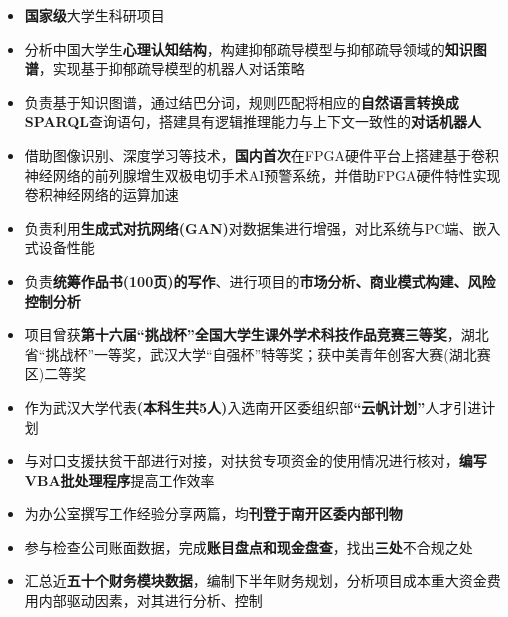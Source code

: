 \documentclass{resume}
\begin{document}
\begin{itemize}
    \item \textbf{国家级}大学生科研项目
    \item 分析中国大学生\textbf{心理认知结构}，构建抑郁疏导模型与抑郁疏导领域的\textbf{知识图谱}，实现基于抑郁疏导模型的机器人对话策略
    \item 负责基于知识图谱，通过结巴分词，规则匹配将相应的\textbf{自然语言转换成SPARQL}查询语句，搭建具有逻辑推理能力与上下文一致性的\textbf{对话机器人}
\end{itemize}

\begin{itemize}
    \item 借助图像识别、深度学习等技术，\textbf{国内首次}在FPGA硬件平台上搭建基于卷积神经网络的前列腺增生双极电切手术AI预警系统，并借助FPGA硬件特性实现卷积神经网络的运算加速
    \item 负责利用\textbf{生成式对抗网络(GAN)}对数据集进行增强，对比系统与PC端、嵌入式设备性能
    \item 负责\textbf{统筹作品书(100页)的写作}、进行项目的\textbf{市场分析、商业模式构建、风险控制分析}
    \item 项目曾获\textbf{第十六届``挑战杯''全国大学生课外学术科技作品竞赛三等奖}，湖北省``挑战杯''一等奖，武汉大学``自强杯''特等奖；获中美青年创客大赛(湖北赛区)二等奖
\end{itemize}

\begin{itemize}
    \item 作为武汉大学代表\textbf{(本科生共5人)}入选南开区委组织部\textbf{``云帆计划''}人才引进计划
    \item 与对口支援扶贫干部进行对接，对扶贫专项资金的使用情况进行核对，\textbf{编写VBA批处理程序}提高工作效率
    \item 为办公室撰写工作经验分享两篇，均\textbf{刊登于南开区委内部刊物}
\end{itemize}
\begin{itemize}
    \item 参与检查公司账面数据，完成\textbf{账目盘点和现金盘查}，找出\textbf{三处}不合规之处
    \item 汇总近\textbf{五十个财务模块数据}，编制下半年财务规划，分析项目成本重大资金费用内部驱动因素，对其进行分析、控制
\end{itemize}
\end{document}
